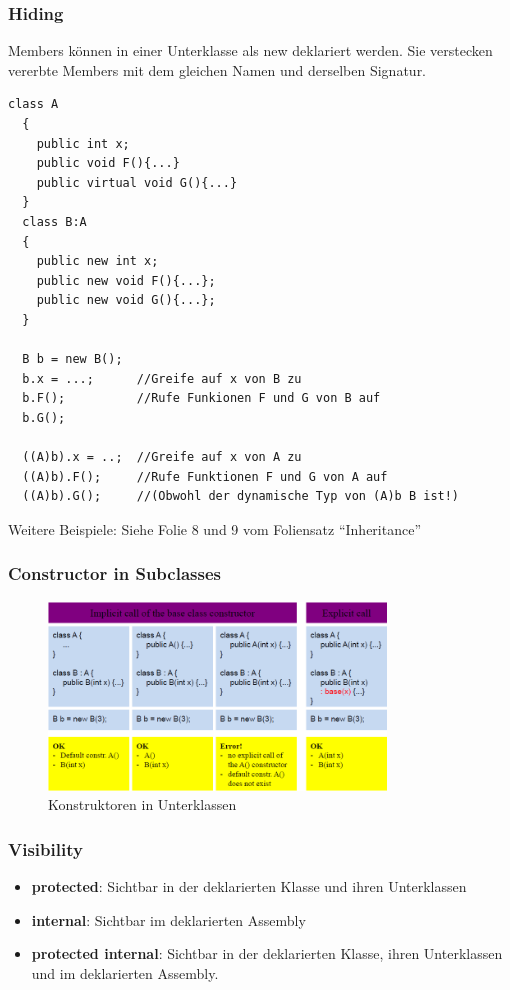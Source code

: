 \subsubsection{Hiding}
Members können in einer Unterklasse als new deklariert werden. Sie verstecken
vererbte Members mit dem gleichen Namen und derselben Signatur. 
\begin{lstlisting}[style=C]
  class A
  {
    public int x; 
    public void F(){...}
    public virtual void G(){...}
  }
  class B:A
  {
    public new int x; 
    public new void F(){...};
    public new void G(){...};
  }
  
  B b = new B(); 
  b.x = ...;      //Greife auf x von B zu 
  b.F();          //Rufe Funkionen F und G von B auf
  b.G(); 
  
  ((A)b).x = ..;  //Greife auf x von A zu
  ((A)b).F();     //Rufe Funktionen F und G von A auf
  ((A)b).G();     //(Obwohl der dynamische Typ von (A)b B ist!)
\end{lstlisting}
Weitere Beispiele: Siehe Folie 8 und 9 vom Foliensatz "`Inheritance"'

\subsubsection{Constructor in Subclasses}
\begin{figure}[h]
  \centering
  \includegraphics[height=5cm, ]{images/CSharp/ConstructorsInSubclasses}
  \caption{Konstruktoren in Unterklassen} 
\end{figure}

\subsubsection{Visibility}
\begin{itemize}
  \item \textbf{protected}: Sichtbar in der deklarierten Klasse und ihren
  Unterklassen
  \item \textbf{internal}: Sichtbar im deklarierten Assembly
  \item \textbf{protected internal}: Sichtbar in der deklarierten Klasse, ihren
  Unterklassen und im deklarierten Assembly. 
\end{itemize}

